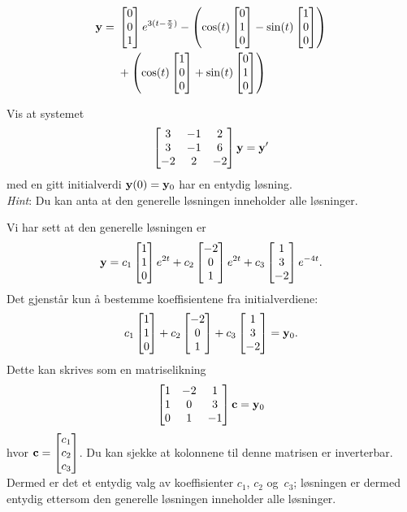 \begin{losning}
	$$	\begin{aligned}
	\mathbf{y}= {} & \begin{bmatrix} 0 \\ 0 \\ 1 \end{bmatrix}e^{3(t-\frac{\pi}{2})}-\left(\cos (t) \begin{bmatrix} 0 \\ 1 \\ 0 \end{bmatrix}-\sin (t) \begin{bmatrix} 1 \\ 0 \\ 0 \end{bmatrix}\right)\\
	& +\left(\cos (t) \begin{bmatrix} 1 \\ 0 \\ 0 \end{bmatrix}+\sin (t) \begin{bmatrix} 0 \\ 1 \\ 0 \end{bmatrix}\right)
	\end{aligned}$$
\end{losning}


\begin{oppgave}
Vis at systemet
$$
\begin{bmatrix}
3 & -1 & 2\\
3 & -1 & 6\\
-2 & 2 & -2
\end{bmatrix} \mathbf{y}= \mathbf{y} '$$
med en gitt initialverdi $\mathbf{y}(0)=\mathbf{y}_0$ har en entydig løsning.\\

\noindent
\emph{Hint}: Du kan anta at den generelle løsningen inneholder alle løsninger.
\end{oppgave}

\begin{losning}
Vi har sett at den generelle løsningen er 
$$\mathbf{y}=c_1\begin{bmatrix} 1 \\ 1 \\ 0 \end{bmatrix}e^{2t}+c_2\begin{bmatrix} -2 \\ 0 \\ 1 \end{bmatrix}e^{2t}+c_3\begin{bmatrix} 1 \\ 3 \\ -2 \end{bmatrix}e^{-4t}.$$ Det gjenstår kun å bestemme koeffisientene fra initialverdiene:
$$c_1\begin{bmatrix} 1 \\ 1 \\ 0 \end{bmatrix}+c_2\begin{bmatrix} -2 \\ 0 \\ 1 \end{bmatrix}+c_3\begin{bmatrix} 1 \\ 3 \\ -2 \end{bmatrix}=\mathbf{y}_0.$$ Dette kan skrives som en matriselikning
$$\begin{bmatrix}
1 & -2 & 1\\
1 & 0 & 3\\
0 & 1 & -1
\end{bmatrix} \mathbf{c}= \mathbf{y}_0$$ hvor $\mathbf{c}=\begin{bmatrix} c_1 \\ c_2 \\ c_3 \end{bmatrix}$. Du kan sjekke at kolonnene til denne matrisen er inverterbar. Dermed er det et entydig valg av koeffisienter $c_1$, $c_2$ og~$c_3$; løsningen er dermed entydig ettersom den generelle løsningen inneholder alle løsninger.
\end{losning}

